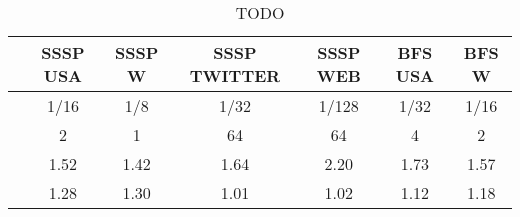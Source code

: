 \begin{table}[h]
\centring
\begin{tabular}{ |c|c|c|c|c|c|c| }
\hline
 & \large{\textbf{SSSP USA}} & \large{\textbf{SSSP W}} & \large{\textbf{SSSP TWITTER}} & \large{\textbf{SSSP WEB}} & \large{\textbf{BFS USA}} & \large{\textbf{BFS W}} \\
\hline
\insprob{} & 1/16 & 1/8 & 1/32 & 1/128 & 1/32 & 1/16 \\
\hline
\delbatch{} & 2 & 1 & 64 & 64 & 4 & 2 \\
\hline
\speed{} & 1.52 & 1.42 & 1.64 & 2.20 & 1.73 & 1.57 \\
\hline
\workinc{} & 1.28 & 1.30 & 1.01 & 1.02 & 1.12 & 1.18 \\
\hline
\end{tabular}
\vspace{0.3em}
\caption{TODO }
\label{table:todo}
\end{table}
